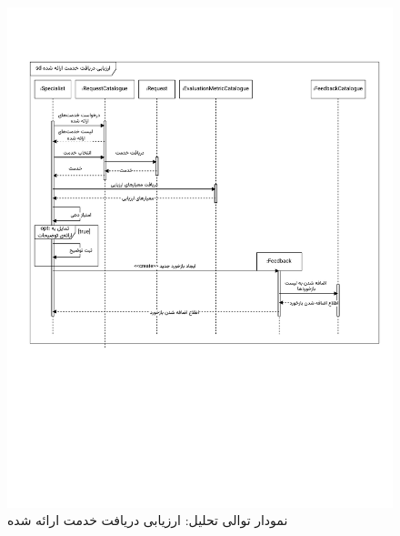 \begin{figure}[ht!]
	\centering
	\includegraphics[scale=0.8, page=1]{figs/OOD-Sequence-3.pdf}
	\caption{نمودار توالی تحلیل: ارزیابی دریافت خدمت ارائه شده}
\end{figure}
\FloatBarrier
\newpage

